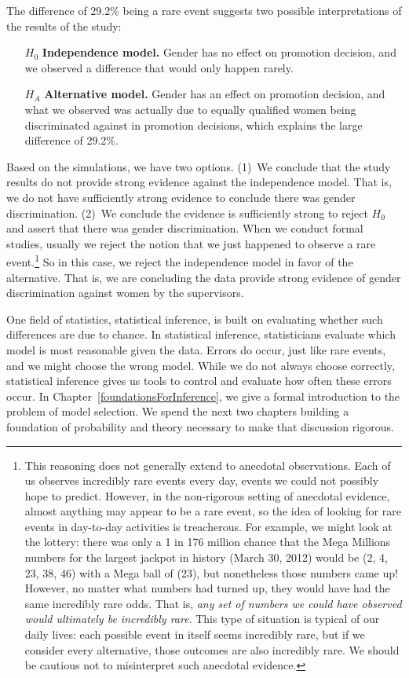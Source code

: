 The difference of 29.2\% being a rare event suggests two possible interpretations of the results of the study:
\begin{itemize}
\setlength{\itemsep}{0mm}
\item[$H_0$] \textbf{Independence model.} Gender has no effect on promotion decision, and we observed a difference that would only happen rarely.
\item[$H_A$] \textbf{Alternative model.} Gender has an effect on promotion decision, and what we observed was actually due to equally qualified women being discriminated against in promotion decisions, which explains the large difference of 29.2\%.
\end{itemize}
Based on the simulations, we have two options. (1)~We conclude that the study results do not provide strong evidence against the independence model. That is, we do not have sufficiently strong evidence to conclude there was gender discrimination. (2)~We conclude the evidence is sufficiently strong to reject $H_0$ and assert that there was gender discrimination. When we conduct formal studies, usually we reject the notion that we just happened to observe a rare event.\footnote{This reasoning does not generally extend to anecdotal observations. Each of us observes incredibly rare events every day, events we could not possibly hope to predict. However, in the non-rigorous setting of anecdotal evidence, almost anything may appear to be a rare event, so the idea of looking for rare events in day-to-day activities is treacherous. For example, we might look at the lottery: there was only a 1 in 176 million chance that the Mega Millions numbers for the largest jackpot in history (March 30, 2012) would be (2, 4, 23, 38, 46) with a Mega ball of (23), but nonetheless those numbers came up! However, no matter what numbers had turned up, they would have had the same incredibly rare odds. That is, \emph{any set of numbers we could have observed would ultimately be incredibly rare}. This type of situation is typical of our daily lives: each possible event in itself seems incredibly rare, but if we consider every alternative, those outcomes are also incredibly rare. We should be cautious not to misinterpret such anecdotal evidence.} So in this case, we reject the independence model in favor of the alternative. That is, we are concluding the data provide strong evidence of gender discrimination against women by the supervisors.


One field of statistics, statistical inference, is built on evaluating whether such differences are due to chance. In statistical inference, statisticians evaluate which model is most reasonable given the data. Errors do occur, just like rare events, and we might choose the wrong model. While we do not always choose correctly, statistical inference gives us tools to control and evaluate how often these errors occur. In Chapter~\ref{foundationsForInference}, we give a formal introduction to the problem of model selection. We spend the next two chapters building a foundation of probability and theory necessary to make that discussion rigorous.
